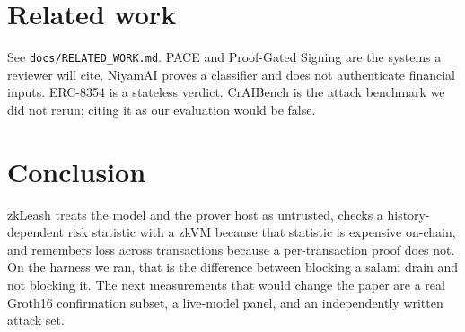 \documentclass[11pt]{article}
\begin{document}
\section{Related work}

See \texttt{docs/RELATED\_WORK.md}. PACE and Proof-Gated Signing are the systems a reviewer will cite. NiyamAI proves a classifier and does not authenticate financial inputs. ERC-8354 is a stateless verdict. CrAIBench is the attack benchmark we did not rerun; citing it as our evaluation would be false.

\section{Conclusion}

zkLeash treats the model and the prover host as untrusted, checks a history-dependent risk statistic with a zkVM because that statistic is expensive on-chain, and remembers loss across transactions because a per-transaction proof does not. On the harness we ran, that is the difference between blocking a salami drain and not blocking it. The next measurements that would change the paper are a real Groth16 confirmation subset, a live-model panel, and an independently written attack set.
\end{document}
